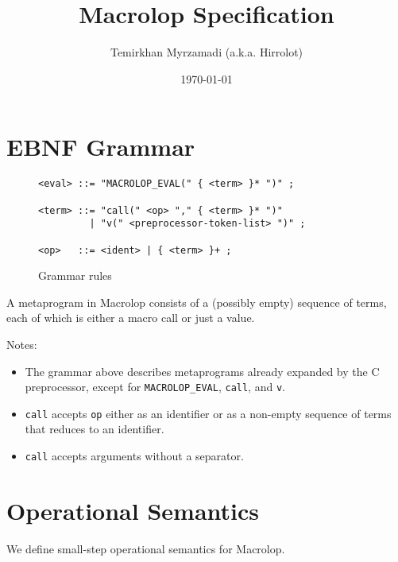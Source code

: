 \documentclass[a4paper, 12pt]{article}
\begin{document}
\title{Macrolop Specification}
\date{\today}
\author{Temirkhan Myrzamadi (a.k.a. Hirrolot)}
\maketitle

\tableofcontents

\newpage

\section{EBNF Grammar}

\begin{figure}[h]
    \caption{Grammar rules}

\begin{verbatim}
<eval> ::= "MACROLOP_EVAL(" { <term> }* ")" ;

<term> ::= "call(" <op> "," { <term> }* ")"
         | "v(" <preprocessor-token-list> ")" ;

<op>   ::= <ident> | { <term> }+ ;
\end{verbatim}

\end{figure}

A metaprogram in Macrolop consists of a (possibly empty) sequence of terms, each of which
is either a macro call or just a value.

Notes:

\begin{itemize}
    \item The grammar above describes metaprograms already expanded by the C preprocessor,
    except for \texttt{MACROLOP\_EVAL}, \texttt{call}, and \texttt{v}.
    \item \texttt{call} accepts \texttt{op} either as an identifier or as a non-empty
    sequence of terms that reduces to an identifier.
    \item \texttt{call} accepts arguments without a separator.
\end{itemize}

\section{Operational Semantics}

We define small-step operational semantics for Macrolop.
\end{document}

